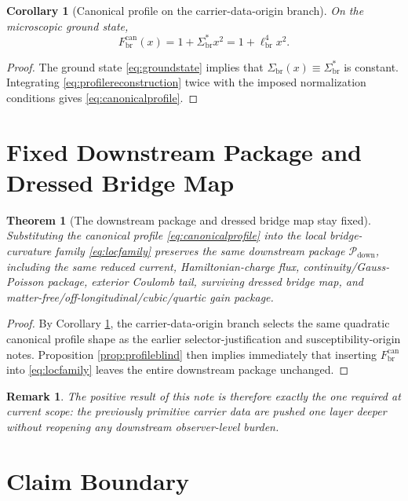\documentclass[11pt]{article}
\newcommand{\CurvScale}{\ell_{\mathrm{br}}}
\newcommand{\CurvProfileCan}{F_{\mathrm{br}}^{\mathrm{can}}}
\newcommand{\DownPkg}{\mathscr P_{\mathrm{down}}}
\newcommand{\RespSus}{\Sigma_{\mathrm{br}}}
\newcommand{\RespSusEq}{\Sigma_{\mathrm{br}}^{\ast}}
\newtheorem{remark}{Remark}
\newtheorem{corollary}{Corollary}
\newtheorem{theorem}{Theorem}
\begin{document}
\begin{corollary}[Canonical profile on the carrier-data-origin branch]
\label{cor:canonicalprofile}
On the microscopic ground state,
\begin{equation}
\CurvProfileCan(x)=1+\RespSusEq x^2
=
1+\CurvScale^4x^2.
\label{eq:canonicalprofile}
\end{equation}
\end{corollary}

\begin{proof}
The ground state \eqref{eq:groundstate} implies that \(\RespSus(x)\equiv\RespSusEq\) is constant. Integrating \eqref{eq:profilereconstruction} twice with the imposed normalization conditions gives \eqref{eq:canonicalprofile}.
\end{proof}

\section{Fixed Downstream Package and Dressed Bridge Map}

\begin{theorem}[The downstream package and dressed bridge map stay fixed]
\label{thm:fixedpackage}
Substituting the canonical profile \eqref{eq:canonicalprofile} into the local bridge-curvature family \eqref{eq:locfamily} preserves the same downstream package \(\DownPkg\), including the same reduced current, Hamiltonian-charge flux, continuity/Gauss-Poisson package, exterior Coulomb tail, surviving dressed bridge map, and matter-free/off-longitudinal/cubic/quartic gain package.
\end{theorem}

\begin{proof}
By Corollary \ref{cor:canonicalprofile}, the carrier-data-origin branch selects the same quadratic canonical profile shape as the earlier selector-justification and susceptibility-origin notes. Proposition \ref{prop:profileblind} then implies immediately that inserting \(\CurvProfileCan\) into \eqref{eq:locfamily} leaves the entire downstream package unchanged.
\end{proof}

\begin{remark}
The positive result of this note is therefore exactly the one required at current scope: the previously primitive carrier data are pushed one layer deeper without reopening any downstream observer-level burden.
\end{remark}

\section{Claim Boundary}
\end{document}
